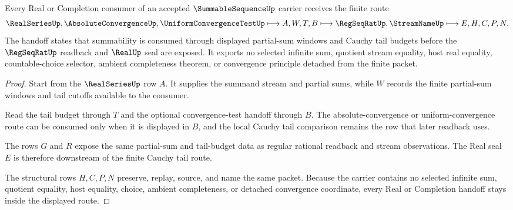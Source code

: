 \begin{theorem}
\label{thm:summable-sequence-real-series-handoff}
Every Real or Completion consumer of an accepted $\SummableSequenceUp$ carrier receives the finite route
$$
\RealSeriesUp,\AbsoluteConvergenceUp,\UniformConvergenceTestUp
\longmapsto
A,W,T,B
\longmapsto
\RegSeqRatUp,\StreamNameUp
\longmapsto
E,H,C,P,N .
$$
The handoff states that summability is consumed through displayed partial-sum windows and Cauchy tail budgets before the $\RegSeqRatUp$ readback and $\RealUp$ seal are exposed. It exports no selected infinite sum, quotient stream equality, host real equality, countable-choice selector, ambient completeness theorem, or convergence principle detached from the finite packet.
\end{theorem}
\begin{proof}
Start from the $\RealSeriesUp$ row $A$. It supplies the summand stream and partial sums, while $W$ records the finite partial-sum windows and tail cutoffs available to the consumer.

Read the tail budget through $T$ and the optional convergence-test handoff through $B$. The absolute-convergence or uniform-convergence route can be consumed only when it is displayed in $B$, and the local Cauchy tail comparison remains the row that later readback uses.

The rows $G$ and $R$ expose the same partial-sum and tail-budget data as regular rational readback and stream observations. The Real seal $E$ is therefore downstream of the finite Cauchy tail route.

The structural rows $H,C,P,N$ preserve, replay, source, and name the same packet. Because the carrier contains no selected infinite sum, quotient equality, host equality, choice, ambient completeness, or detached convergence coordinate, every Real or Completion handoff stays inside the displayed route.
\end{proof}



